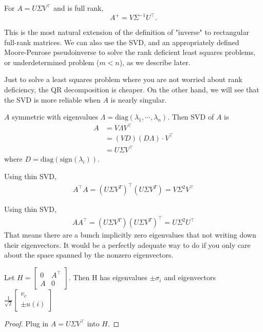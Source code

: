 \documentclass[11pt]{article}
\numberwithin{equation}{section}
\begin{document}
\begin{definition}
    For $A=U \Sigma V^{\top}$ and is full rank, $$A^{+}=V \Sigma^{-1} U^{\top }.$$
\end{definition}

This is the most natural extension of the definition of "inverse" to rectangular full-rank matrices. We can also use the SVD, 
and an appropriately defined Moore-Penrose pseudoinverse to solve the rank deficient least squares problems, or underdetermined problem ($m < n$), 
as we describe later.

Just to solve a least squares problem where you are not worried about rank deficiency, the QR decomposition is cheaper.
On the other hand, we will see that the SVD is more reliable when $A$ is nearly singular.

\begin{fact}
    $A$ symmetric with eigenvalues $\Lambda=\mathrm{diag}(\lambda_1, \cdots, \lambda_n)$. Then SVD of $A$ is 
    \begin{align*}
        A&=V \Lambda V^{\top } \\
        &= (V D)(D \Lambda) \cdot V^{\top} \\
        &= U \Sigma V^{\top }
    \end{align*}
    where $D=\mathrm{diag}(\mathrm{sign}(\lambda_i))$.
\end{fact}
\begin{fact}
    Using thin SVD,
    \begin{align*}
        A^\top A= (U \Sigma V^{T})^{\top}(U \Sigma V^{T})=V\Sigma^2V^\top 
    \end{align*}
\end{fact}
\begin{fact}
    Using thin SVD,
    \begin{align*}
        AA^\top  = (U \Sigma V^{T})(U \Sigma V^{T})^{\top}=U\Sigma^2U^\top 
    \end{align*}
    That means there are a bunch implicitly zero eigenvalues that not writing down their eigenvectors. 
    It would be a perfectly adequate way to do if you only care about the space spanned by the nonzero eigenvectors.
\end{fact}

\begin{fact}
    Let $H=\left[\begin{array}{ll}
        0 & A^{\top} \\
        A & 0
        \end{array}\right]$. Then H has eigenvalues $\pm \sigma_i$ and eigenvectors $\frac{1}{\sqrt{2}}\left[\begin{array}{c}
            v_c \\
            \pm u(i)
            \end{array}\right]$
    \begin{proof}
        Plug in $A=U \Sigma V^{\top}$ into $H$.
    \end{proof}
\end{fact}
\end{document}
